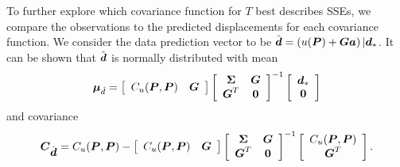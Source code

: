 \documentclass[extra,mreferee]{gji}
\begin{document}
To further explore which covariance function for $T$ best describes SSEs, we compare the observations to the predicted displacements for each covariance function. We consider the data prediction vector to be $\hat{\mitbf{d}} = \left(u(\mitbf{P}) + \mitbf{G}\mitbf{a}\right)|\mitbf{d}_*$. It can be shown that $\hat{\mitbf{d}}$ is normally distributed with mean 
\begin{equation}\label{eq:DataPredMean}
\mitbf{\mu}_{\hat{d}} = \left[\begin{array}{cc}
                           C_u(\mitbf{P},\mitbf{P}) & \mitbf{G} \\
                           \end{array}\right]
                     \left[\begin{array}{cc}
                           \mitbf{\Sigma} & \mitbf{G} \\
                           \mitbf{G}^T  & \mitbf{0} \\
                           \end{array}\right]^{-1}
                     \left[\begin{array}{c}
                           \mitbf{d}_* \\
                           \mitbf{0} \\
                           \end{array}\right]
\end{equation}  
and covariance
\begin{equation}\label{eq:DataPredCov}
\mitbf{C}_{\hat{\mitbf{d}}} = C_u(\mitbf{P},\mitbf{P}) - 
                        \left[\begin{array}{cc}
                              C_u(\mitbf{P},\mitbf{P}) & \mitbf{G} \\
                              \end{array}\right]
                        \left[\begin{array}{cc}
                              \mitbf{\Sigma} & \mitbf{G} \\
                              \mitbf{G}^T  & \mitbf{0} \\
                              \end{array}\right]^{-1}
                        \left[\begin{array}{c}
                              C_u(\mitbf{P},\mitbf{P}) \\
                              \mitbf{G}^T \\
                              \end{array}\right].
\end{equation}
\end{document}
